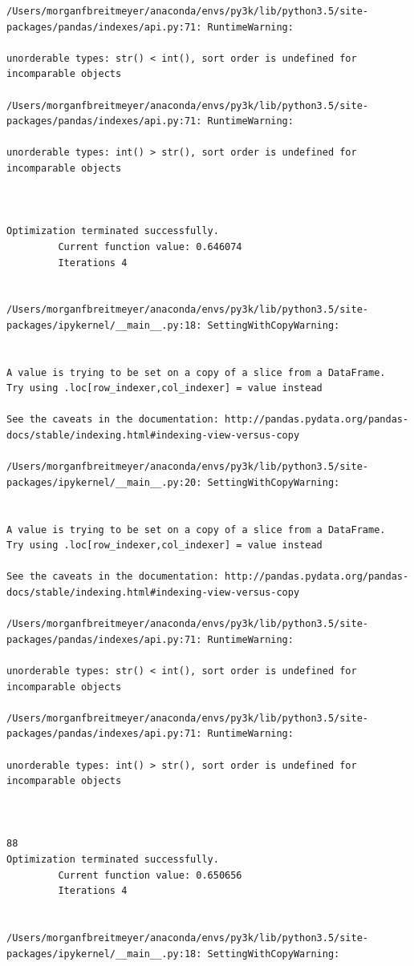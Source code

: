 \begin{lstlisting}
/Users/morganfbreitmeyer/anaconda/envs/py3k/lib/python3.5/site-packages/pandas/indexes/api.py:71: RuntimeWarning:

unorderable types: str() < int(), sort order is undefined for incomparable objects

/Users/morganfbreitmeyer/anaconda/envs/py3k/lib/python3.5/site-packages/pandas/indexes/api.py:71: RuntimeWarning:

unorderable types: int() > str(), sort order is undefined for incomparable objects



Optimization terminated successfully.
         Current function value: 0.646074
         Iterations 4


/Users/morganfbreitmeyer/anaconda/envs/py3k/lib/python3.5/site-packages/ipykernel/__main__.py:18: SettingWithCopyWarning:


A value is trying to be set on a copy of a slice from a DataFrame.
Try using .loc[row_indexer,col_indexer] = value instead

See the caveats in the documentation: http://pandas.pydata.org/pandas-docs/stable/indexing.html#indexing-view-versus-copy

/Users/morganfbreitmeyer/anaconda/envs/py3k/lib/python3.5/site-packages/ipykernel/__main__.py:20: SettingWithCopyWarning:


A value is trying to be set on a copy of a slice from a DataFrame.
Try using .loc[row_indexer,col_indexer] = value instead

See the caveats in the documentation: http://pandas.pydata.org/pandas-docs/stable/indexing.html#indexing-view-versus-copy

/Users/morganfbreitmeyer/anaconda/envs/py3k/lib/python3.5/site-packages/pandas/indexes/api.py:71: RuntimeWarning:

unorderable types: str() < int(), sort order is undefined for incomparable objects

/Users/morganfbreitmeyer/anaconda/envs/py3k/lib/python3.5/site-packages/pandas/indexes/api.py:71: RuntimeWarning:

unorderable types: int() > str(), sort order is undefined for incomparable objects



88
Optimization terminated successfully.
         Current function value: 0.650656
         Iterations 4


/Users/morganfbreitmeyer/anaconda/envs/py3k/lib/python3.5/site-packages/ipykernel/__main__.py:18: SettingWithCopyWarning:



\end{lstlisting}
